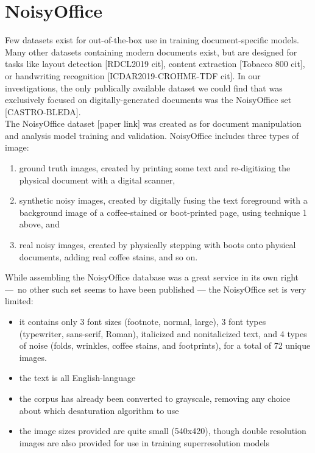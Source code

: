 \documentclass[runningheads]{article}
\begin{document}
\section{NoisyOffice}
\label{sec:orga476358}
Few datasets exist for out-of-the-box use in training document-specific models. Many other datasets containing modern documents exist, but are designed for tasks like layout detection [RDCL2019 cit], content extraction [Tobacco 800 cit], or handwriting recognition [ICDAR2019-CROHME-TDF cit]. In our investigations, the only publically available dataset we could find that was exclusively focused on digitally-generated documents was the NoisyOffice set [CASTRO-BLEDA].\\

The NoisyOffice dataset [paper link] was created as for document manipulation and analysis model training and validation. NoisyOffice includes three types of image:
\begin{enumerate}
\item ground truth images, created by printing some text and re-digitizing the physical document with a digital scanner,
\item synthetic noisy images, created by digitally fusing the text foreground with a background image of a coffee-stained or boot-printed page, using technique 1 above, and
\item real noisy images, created by physically stepping with boots onto physical documents, adding real coffee stains, and so on.
\end{enumerate}

While assembling the NoisyOffice database was a great service in its own right — no other such set seems to have been published — the NoisyOffice set is very limited:\\

\begin{itemize}
\item it contains only 3 font sizes (footnote, normal, large), 3 font types (typewriter, sans-serif, Roman), italicized and nonitalicized text, and 4 types of noise (folds, wrinkles, coffee stains, and footprints), for a total of 72 unique images.
\item the text is all English-language
\item the corpus has already been converted to grayscale, removing any choice about which desaturation algorithm to use
\item the image sizes provided are quite small (540x420), though double resolution images are also provided for use in training superresolution models
\end{itemize}
\end{document}
